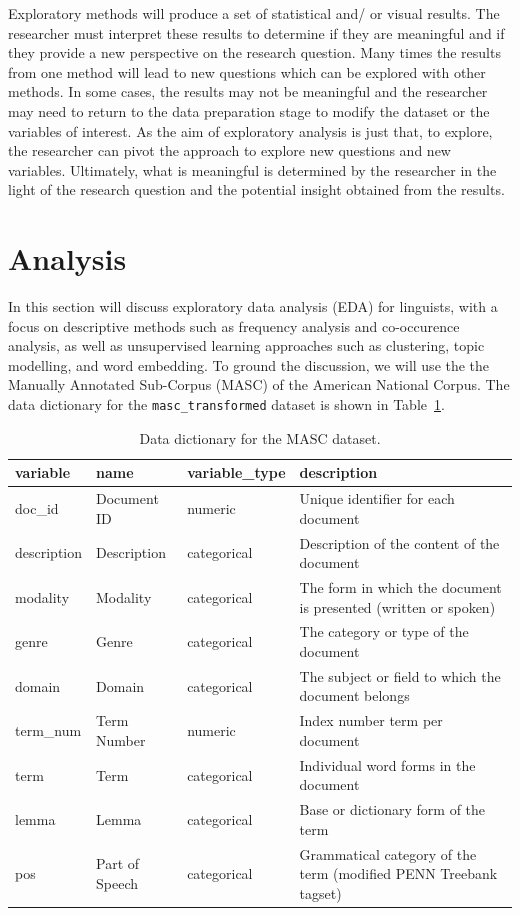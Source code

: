 \documentclass[
  letterpaper,
  DIV=11,
  numbers=noendperiod]{scrreport}
\theoremstyle{definition}
\theoremstyle{remark}
\begin{document}
Exploratory methods will produce a set of statistical and/ or visual
results. The researcher must interpret these results to determine if
they are meaningful and if they provide a new perspective on the
research question. Many times the results from one method will lead to
new questions which can be explored with other methods. In some cases,
the results may not be meaningful and the researcher may need to return
to the data preparation stage to modify the dataset or the variables of
interest. As the aim of exploratory analysis is just that, to explore,
the researcher can pivot the approach to explore new questions and new
variables. Ultimately, what is meaningful is determined by the
researcher in the light of the research question and the potential
insight obtained from the results.

\hypertarget{sec-eda-analysis}{%
\section{Analysis}\label{sec-eda-analysis}}

In this section will discuss exploratory data analysis (EDA) for
linguists, with a focus on descriptive methods such as frequency
analysis and co-occurence analysis, as well as unsupervised learning
approaches such as clustering, topic modelling, and word embedding. To
ground the discussion, we will use the the Manually Annotated Sub-Corpus
(MASC) of the American National Corpus. The data dictionary for the
\texttt{masc\_transformed} dataset is shown in
Table~\ref{tbl-eda-masc-dd-show}.

\hypertarget{tbl-eda-masc-dd-show}{}
\begin{table}
\caption{\label{tbl-eda-masc-dd-show}Data dictionary for the MASC dataset. }\tabularnewline

\centering
\begin{tabular}{l|l|l|l}
\hline
variable & name & variable\_type & description\\
\hline
doc\_id & Document ID & numeric & Unique identifier for each document\\
\hline
description & Description & categorical & Description of the content of the document\\
\hline
modality & Modality & categorical & The form in which the document is presented (written or spoken)\\
\hline
genre & Genre & categorical & The category or type of the document\\
\hline
domain & Domain & categorical & The subject or field to which the document belongs\\
\hline
term\_num & Term Number & numeric & Index number term per document\\
\hline
term & Term & categorical & Individual word forms in the document\\
\hline
lemma & Lemma & categorical & Base or dictionary form of the term\\
\hline
pos & Part of Speech & categorical & Grammatical category of the term (modified PENN Treebank tagset)\\
\hline
\end{tabular}
\end{table}
\end{document}
